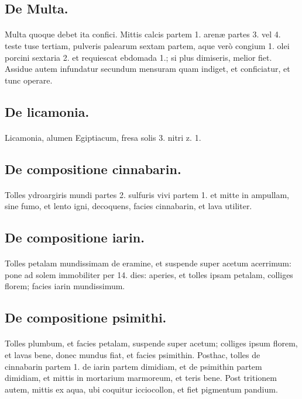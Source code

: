 \documentclass[a4paper, 11pt, oneside, polutonikogreek, italian]{article}
\begin{document}
\subsection{De Multa.}
\paragraph{}
Multa quoque debet ita confici. Mittis calcis partem 1. arenæ partes 3. vel 4. teste tuse tertiam, pulveris palearum sextam partem, aque verò congium 1. olei porcini sextaria 2. et requiescat ebdomada 1.; si plus dimiseris, melior fiet. Assidue autem infundatur secundum mensuram quam indiget, et conficiatur, et tunc operare.

\subsection{De licamonia.}
\paragraph{}
Licamonia, alumen Egiptiacum, fresa solis 3. nitri z. 1.

\subsection{De compositione cinnabarin.}
\paragraph{}
Tolles ydroargiris mundi partes 2. sulfuris vivi partem 1. et mitte in ampullam, sine fumo, et lento igni, decoquens, facies cinnabarin, et lava utiliter.

\subsection{De compositione iarin.}
\paragraph{}
Tolles petalam mundissimam de eramine, et suspende super acetum acerrimum: pone ad solem immobiliter per 14. dies: aperies, et tolles ipsam petalam, colliges florem; facies iarin mundissimum.

\subsection{De compositione psimithi.}
\paragraph{}
Tolles plumbum, et facies petalam, suspende super acetum; colliges ipsum florem, et lavas bene, donec mundus fiat, et facies psimithin. Posthac, tolles de cinnabarin partem 1. de iarin partem dimidiam, et de psimithin partem dimidiam, et mittis in mortarium marmoreum, et teris bene. Post tritionem autem, mittis ex aqua, ubi coquitur icciocollon, et fiet pigmentum pandium.
\end{document}
